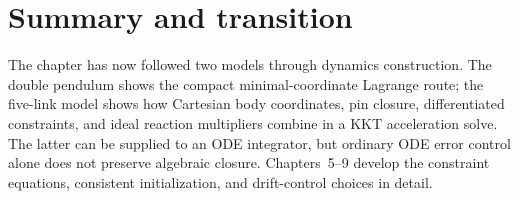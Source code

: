 \documentclass[../main.tex]{subfiles}
\begin{document}
\section{Summary and transition}

	The chapter has now followed two models through dynamics construction. The double pendulum shows the compact minimal-coordinate Lagrange route; the five-link model shows how Cartesian body coordinates, pin closure, differentiated constraints, and ideal reaction multipliers combine in a KKT acceleration solve. The latter can be supplied to an ODE integrator, but ordinary ODE error control alone does not preserve algebraic closure. Chapters~5--9 develop the constraint equations, consistent initialization, and drift-control choices in detail.

\ifSubfilesClassLoaded{\backmatter\bookbibliography}{}
\end{document}
